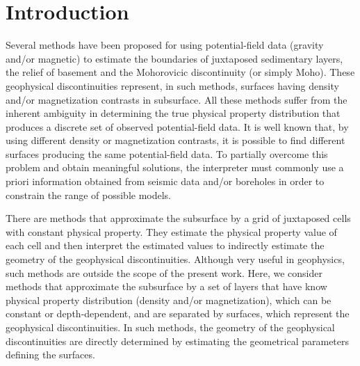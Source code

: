 \documentclass[manuscript]{geophysics}
\begin{document}
\section{Introduction}

Several methods have been proposed for using potential-field data
(gravity and/or magnetic) to estimate the boundaries of juxtaposed sedimentary layers, 
the relief of basement and the Mohorovicic discontinuity (or simply Moho).
These geophysical discontinuities represent, in such methods, 
surfaces having density and/or magnetization contrasts in subsurface.
All these methods suffer from the inherent ambiguity \citep{skeels1947, roy1962} in
determining the true physical property distribution that produces a discrete set of
observed potential-field data. 
It is well known that, by using different density or magnetization contrasts, 
it is possible to find different surfaces producing the same potential-field data. 
To partially overcome this problem and obtain meaningful solutions, the interpreter
must commonly use a priori information obtained from seismic data and/or boreholes in
order to constrain the range of possible models.

There are methods that approximate the subsurface by a grid of
juxtaposed cells with constant physical property. 
They estimate the physical property value of each cell and then 
interpret the estimated values to indirectly estimate the geometry of the 
geophysical discontinuities.
Although very useful in geophysics, such methods are outside the scope of the present work.
Here, we consider methods that approximate the subsurface by a set of layers that have
know physical property distribution (density and/or magnetization), which can be
constant or depth-dependent, and are separated by surfaces, which represent the
geophysical discontinuities.
In such methods, the geometry of the geophysical discontinuities are directly determined
by estimating the geometrical parameters defining the surfaces.
\end{document}
